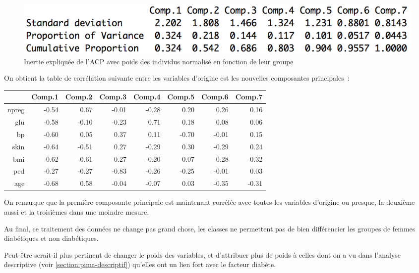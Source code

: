 \documentclass[a4paper,11pt]{report}
\begin{document}
\begin{figure}[H]
	\centering
	\captionsetup{justification=centering, margin=2cm}
	\includegraphics[width=.7\linewidth]{img/2-4-Pima-ACP-dp-inertie-expliquee}
	\caption{\scriptsize Inertie expliquée de l'ACP avec poids des individus normalisé en fonction de leur groupe}
	\label{fig:2-4-Pima-ACP-dp-inertie-expliquee}
\end{figure}

On obtient la table de corrélation suivante entre les variables d'origine est les nouvelles composantes principales~:

\begin{table}[H]
	\centering
	\begin{tabular}{r|rrrrrrr}
		& Comp.1 & Comp.2 & Comp.3 & Comp.4 & Comp.5 & Comp.6 & Comp.7 \\ 
		\hline
		npreg & -0.54 & 0.67 & -0.01 & -0.28 & 0.20 & 0.26 & 0.16 \\ 
		glu & -0.58 & -0.10 & -0.23 & 0.71 & 0.18 & 0.08 & 0.06 \\ 
		bp & -0.60 & 0.05 & 0.37 & 0.11 & -0.70 & -0.01 & 0.15 \\ 
		skin & -0.64 & -0.51 & 0.27 & -0.29 & 0.30 & -0.29 & 0.24 \\ 
		bmi & -0.62 & -0.61 & 0.27 & -0.20 & 0.07 & 0.28 & -0.32 \\ 
		ped & -0.27 & -0.27 & -0.83 & -0.26 & -0.25 & -0.01 & 0.03 \\ 
		age & -0.68 & 0.58 & -0.04 & -0.07 & 0.03 & -0.35 & -0.31 \\ 
	\end{tabular}
\end{table}

On remarque que la première composante principale est maintenant corrélée avec toutes les variables d'origine ou presque, la deuxième aussi et la troisièmes dans une moindre mesure.

Au final, ce traitement des données ne change pas grand chose, les classes ne permettent pas de bien différencier les groupes de femmes diabétiques et non diabétiques.


Peut-être serait-il plus pertinent de changer le poids des variables, et d'attribuer plus de poids à celles dont on a vu dans l'analyse descriptive (voir \autoref{section:pima-descriptif}) qu'elles ont un lien fort avec le facteur diabète.
\end{document}
